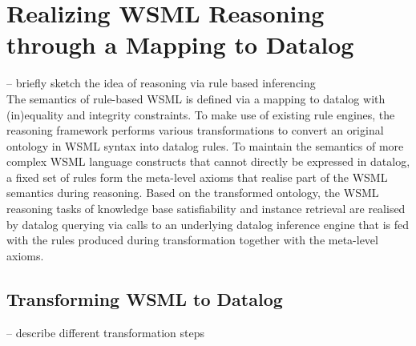 \newcommand{\smtxtit}[1]{\begin{scriptsize}\ensuremath{\textit{#1}}\end{scriptsize}}
\newcommand{\trans}[1]{\ensuremath{\tau_{#1}}\xspace}
\newcommand{\transtxt}[1]{\trans{\smtxtit{#1}}}
\def\transax{\transtxt{axioms}}
\def\transnorm{\transtxt{norm}}
\def\translt{\transtxt{lt}}
\def\transdlog{\transtxt{datalog}}

\def\LE{\ensuremath{\mathcal{L\!E}}\xspace}
\def\O{\ensuremath{\mathcal{O}}\xspace}
\def\P{\ensuremath{\mathcal{P}}\xspace}
\newcommand{\powset}[1]{\ensuremath{2^{#1}}\xspace}
\def\lprl{\ensuremath{\;:\!-\:}}
\def\cstr{\ensuremath{\;!-\:}}

\newcommand{\predicate}[1]{\ensuremath{p_{#1}}\xspace}
\newcommand{\predsubtxt}[1]{\mathrm{\sf #1}}
\def\psco{\predicate{\predsubtxt{sco}}}
\def\pmo{\predicate{\predsubtxt{mo}}}
\def\phval{\predicate{\predsubtxt{hval}}}
\def\pitype{\predicate{\predsubtxt{itype}}}
\def\potype{\predicate{\predsubtxt{otype}}}
\def\mlaxioms{\ensuremath{P_{\smtxtit{meta}}}\xspace}

\section{Realizing WSML Reasoning through a Mapping to Datalog\label{sec:mapping}}
-- briefly sketch the idea of reasoning via rule based inferencing \\

The semantics of rule-based WSML is defined via a mapping to
datalog with (in)equality and integrity constraints.  To make use of existing
rule engines, the reasoning framework performs various
transformations to convert an original ontology in WSML syntax
into datalog rules. To maintain the semantics of more complex WSML
language constructs that cannot directly be expressed in datalog,
a fixed set of rules form the meta-level axioms that realise part
of the WSML semantics during reasoning. Based on the transformed
ontology, the WSML reasoning tasks of knowledge base
satisfiability and instance retrieval are realised by datalog
querying via calls to an underlying datalog inference engine that
is fed with the rules produced during transformation together with
the meta-level axioms.

\subsection{Transforming WSML to Datalog}
-- describe different transformation steps \\

